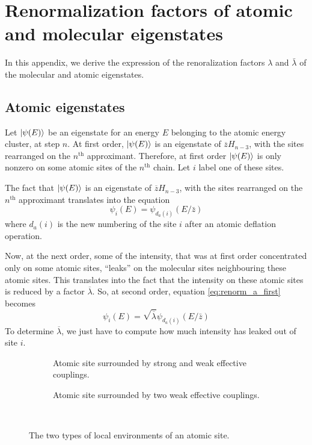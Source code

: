 \documentclass[11pt]{article}
\newcommand{\lb}{\ensuremath{\overline{\lambda}}}
\newcommand{\zb}{\ensuremath{\overline{z}}}
\begin{document}
\newpage
\appendix

\section{Renormalization factors of atomic and molecular eigenstates}
\label{app:renorm}

In this appendix, we derive the expression of the renoralization factors $\lambda$ and $\bar \lambda$ of the molecular and atomic eigenstates.

\subsection{Atomic eigenstates}

Let $\ket{\psi(E)}$ be an eigenstate for an energy $E$ belonging to the atomic energy cluster, at step $n$.
At first order, $\ket{\psi(E)}$ is an eigenstate of $\zb H_{n-3}$, with the sites rearranged on the $n^\text{th}$ approximant.
Therefore, at first order $\ket{\psi(E)}$ is only nonzero on some atomic sites of the $n^\text{th}$ chain. Let $i$ label one of these sites.

The fact that $\ket{\psi(E)}$ is an eigenstate of $\zb H_{n-3}$, with the sites rearranged on the $n^\text{th}$ approximant translates into the equation
\begin{equation}
\label{eq:renorm_a_first}
	\psi_i(E) = \psi_{d_a(i)}(E/\bar z)
\end{equation}
where $d_a(i)$ is the new numbering of the site $i$ after an atomic deflation operation.

Now, at the next order, some of the intensity, that was at first order concentrated only on some atomic sites, ``leaks'' on the molecular sites neighbouring these atomic sites. 
This translates into the fact that the intensity on these atomic sites is reduced by a factor $\lb$.
So, at second order, equation \eqref{eq:renorm_a_first} becomes
\begin{equation}
\label{eq:renorm_a}
	\psi_i(E) = \sqrt{\lb} \psi_{d_a(i)}(E/\bar z)
\end{equation}
To determine $\lb$, we just have to compute how much intensity has leaked out of site $i$.

\begin{figure}[htp]

\centering
\begin{subfigure}{.5\textwidth}
  \centering
  
  \caption{Atomic site surrounded by strong and weak effective couplings.}
  \label{fig:mod1}
\end{subfigure}%
\begin{subfigure}{.5\textwidth}
  \centering
  
  \caption{Atomic site surrounded by two weak effective couplings.}
  \label{fig:atom1}
\end{subfigure} \\

\caption{The two types of local environments of an atomic site. }
\label{fig:energyconf1}
\end{figure}
\end{document}
